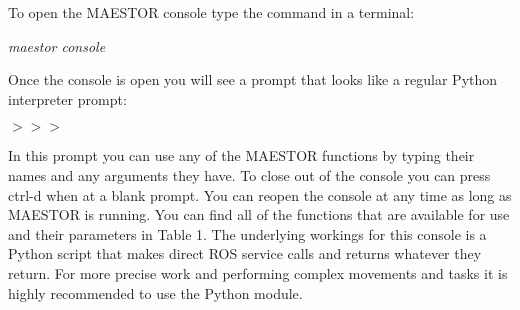 \documentclass[12pt]{article}
\begin{document}
To open the MAESTOR console type the command in a terminal:
	\begin{center}
		\textit{maestor console}
	\end{center}
Once the console is open you will see a prompt that looks like a regular Python interpreter prompt:

	\begin{center}
		$>>>$
	\end{center}
	
In this prompt you can use any of the MAESTOR functions by typing their names and any arguments they have. To close out of the console you can press ctrl-d when at a blank prompt. You can reopen the console at any time as long as MAESTOR is running. You can find all of the functions that are available for use and their parameters in Table 1. The underlying workings for this console is a Python script that makes direct ROS service calls and returns whatever they return. For more precise work and performing complex movements and tasks it is highly recommended to use the Python module. 
\end{document}
